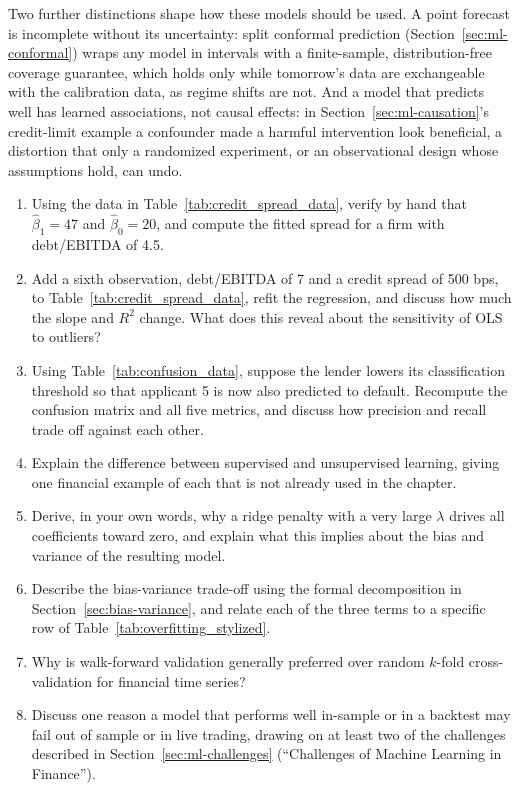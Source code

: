 \documentclass[../ai_in_finance]{subfiles}
\begin{document}
Two further distinctions shape how these models should be used. A point forecast is incomplete without its uncertainty: split conformal prediction (Section~\ref{sec:ml-conformal}) wraps any model in intervals with a finite-sample, distribution-free coverage guarantee, which holds only while tomorrow's data are exchangeable with the calibration data, as regime shifts are not. And a model that predicts well has learned associations, not causal effects: in Section~\ref{sec:ml-causation}'s credit-limit example a confounder made a harmful intervention look beneficial, a distortion that only a randomized experiment, or an observational design whose assumptions hold, can undo.


\begin{enumerate}[exercises]
    \item Using the data in Table~\ref{tab:credit_spread_data}, verify by hand that $\hat\beta_1 = 47$ and $\hat\beta_0 = 20$, and compute the fitted spread for a firm with debt/EBITDA of 4.5.
    \item Add a sixth observation, debt/EBITDA of 7 and a credit spread of 500 bps, to Table~\ref{tab:credit_spread_data}, refit the regression, and discuss how much the slope and $R^2$ change. What does this reveal about the sensitivity of OLS to outliers?
    \item Using Table~\ref{tab:confusion_data}, suppose the lender lowers its classification threshold so that applicant 5 is now also predicted to default. Recompute the confusion matrix and all five metrics, and discuss how precision and recall trade off against each other.
    \item Explain the difference between supervised and unsupervised learning, giving one financial example of each that is not already used in the chapter.
    \item Derive, in your own words, why a ridge penalty with a very large $\lambda$ drives all coefficients toward zero, and explain what this implies about the bias and variance of the resulting model.
    \item Describe the bias-variance trade-off using the formal decomposition in Section~\ref{sec:bias-variance}, and relate each of the three terms to a specific row of Table~\ref{tab:overfitting_stylized}.
    \item Why is walk-forward validation generally preferred over random $k$-fold cross-validation for financial time series?
    \item Discuss one reason a model that performs well in-sample or in a backtest may fail out of sample or in live trading, drawing on at least two of the challenges described in Section~\ref{sec:ml-challenges} (``Challenges of Machine Learning in Finance'').

\end{enumerate}
\end{document}
